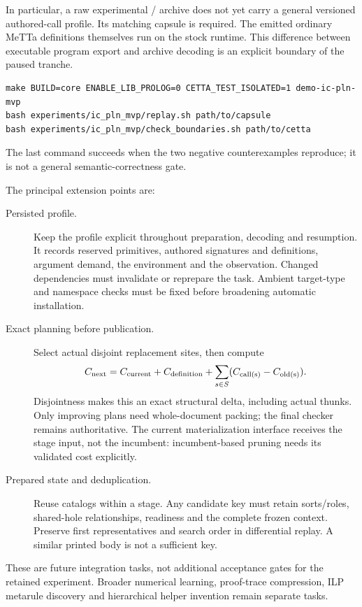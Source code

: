 \documentclass[11pt,a4paper]{article}
\newcommand{\code}[1]{\texttt{\detokenize{#1}}}
\begin{document}
In particular, a raw experimental \code{LC2}/\code{LM1} archive does not yet
carry a general versioned authored-call profile. Its matching capsule is
required. The emitted ordinary MeTTa definitions themselves run on the stock
runtime. This difference between executable program export and archive decoding
is an explicit boundary of the paused tranche.

\begin{lstlisting}
make BUILD=core ENABLE_LIB_PROLOG=0 CETTA_TEST_ISOLATED=1 demo-ic-pln-mvp
bash experiments/ic_pln_mvp/replay.sh path/to/capsule
bash experiments/ic_pln_mvp/check_boundaries.sh path/to/cetta
\end{lstlisting}
The last command succeeds when the two negative counterexamples reproduce;
it is not a general semantic-correctness gate.

The principal extension points are:
\begin{description}
\item[Persisted profile.] Keep the profile explicit throughout preparation,
decoding and resumption. It records reserved primitives, authored signatures
and definitions, argument demand, the environment and the observation. Changed
dependencies must invalidate or reprepare the task. Ambient target-type and
namespace checks must be fixed before broadening automatic installation.
\item[Exact planning before publication.] Select actual disjoint replacement
sites, then compute
\[
C_{\rm next}=C_{\rm current}+C_{\rm definition}
 +\sum_{s\in S}(C_{\rm call(s)}-C_{\rm old(s)}).
\]
Disjointness makes this an exact structural delta, including actual thunks.
Only improving plans need whole-document packing; the final checker remains
authoritative. The current materialization interface receives the stage input,
not the incumbent: incumbent-based pruning needs its validated cost explicitly.
\item[Prepared state and deduplication.] Reuse catalogs within a stage. Any
candidate key must retain sorts/roles, shared-hole relationships, readiness and
the complete frozen context. Preserve first representatives and search order
in differential replay. A similar printed body is not a sufficient key.
\end{description}
These are future integration tasks, not additional acceptance gates for the
retained experiment. Broader numerical learning, proof-trace compression,
ILP metarule discovery and hierarchical helper invention remain separate tasks.
\end{document}
